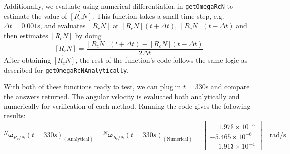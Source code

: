\documentclass[conf]{new-aiaa}
\begin{document}
Additionally, we evaluate using numerical differentiation in \texttt{getOmegaRcN} to estimate the value of $\dot{[R_cN]}$. This function takes a small time step, e.g. $\Delta t=0.001$s, and evaluates $[R_cN]$ at $[R_cN](t+\Delta t),\ [R_cN](t-\Delta t)$ and then estimates $\dot{[R_cN]}$ by doing
\[
\dot{[R_cN]} = \frac{[R_cN](t+\Delta t) - [R_cN](t-\Delta t)}{2\Delta t} 
\]
After obtaining $\dot{[R_cN]}$, the rest of the function's code follows the same logic as described for \texttt{getOmegaRcNAnalytically}.

With both of these functions ready to test, we can plug in $t=330$s and compare the answers returned. The angular velocity is evaluated both analytically and numerically for verification of each method. Running the code gives the following results:
\[
{}^N\bm{\omega}_{R_c/N}(t=330s)_{(\text{Analytical})} = {}^N\bm{\omega}_{R_c/N}(t=330s)_{(\text{Numerical})} =
\begin{bmatrix}
\phantom{-}1.978 \times 10^{-5} \\
-5.465 \times 10^{-6} \\
\phantom{-}1.913 \times 10^{-4}
\end{bmatrix} \quad \text{rad/s}
\]
\end{document}
